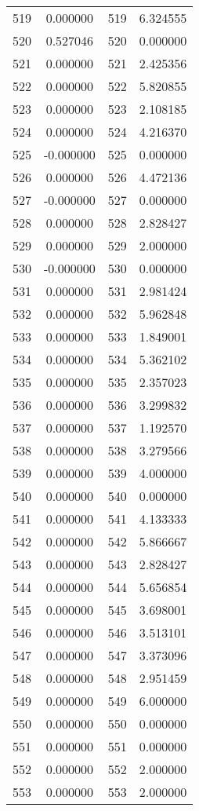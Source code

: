 \documentclass[12pt]{article}
\begin{document}
\begin{longtable}{@{}cccc@{}}
519 & 0.000000 & 519 & 6.324555 \\
520 & 0.527046 & 520 & 0.000000 \\
521 & 0.000000 & 521 & 2.425356 \\
522 & 0.000000 & 522 & 5.820855 \\
523 & 0.000000 & 523 & 2.108185 \\
524 & 0.000000 & 524 & 4.216370 \\
525 & -0.000000 & 525 & 0.000000 \\
526 & 0.000000 & 526 & 4.472136 \\
527 & -0.000000 & 527 & 0.000000 \\
528 & 0.000000 & 528 & 2.828427 \\
529 & 0.000000 & 529 & 2.000000 \\
530 & -0.000000 & 530 & 0.000000 \\
531 & 0.000000 & 531 & 2.981424 \\
532 & 0.000000 & 532 & 5.962848 \\
533 & 0.000000 & 533 & 1.849001 \\
534 & 0.000000 & 534 & 5.362102 \\
535 & 0.000000 & 535 & 2.357023 \\
536 & 0.000000 & 536 & 3.299832 \\
537 & 0.000000 & 537 & 1.192570 \\
538 & 0.000000 & 538 & 3.279566 \\
539 & 0.000000 & 539 & 4.000000 \\
540 & 0.000000 & 540 & 0.000000 \\
541 & 0.000000 & 541 & 4.133333 \\
542 & 0.000000 & 542 & 5.866667 \\
543 & 0.000000 & 543 & 2.828427 \\
544 & 0.000000 & 544 & 5.656854 \\
545 & 0.000000 & 545 & 3.698001 \\
546 & 0.000000 & 546 & 3.513101 \\
547 & 0.000000 & 547 & 3.373096 \\
548 & 0.000000 & 548 & 2.951459 \\
549 & 0.000000 & 549 & 6.000000 \\
550 & 0.000000 & 550 & 0.000000 \\
551 & 0.000000 & 551 & 0.000000 \\
552 & 0.000000 & 552 & 2.000000 \\
553 & 0.000000 & 553 & 2.000000 \\

\end{longtable}
\end{document}
